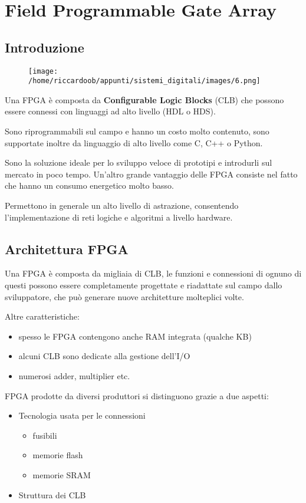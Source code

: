 \chapter{Field Programmable Gate Array}

\section{Introduzione}
\begin{figure}[H]
    \centering
    \texttt{[image: /home/riccardoob/appunti/sistemi\_digitali/images/6.png]}
\end{figure}

Una FPGA è composta da \textbf{Configurable Logic Blocks} (CLB) che possono essere connessi con linguaggi ad alto livello (HDL o HDS).

Sono riprogrammabili sul campo e hanno un costo molto contenuto, sono supportate inoltre da linguaggio di alto livello come C, C++ o Python.

Sono la soluzione ideale per lo sviluppo veloce di prototipi e introdurli sul mercato in poco tempo. Un'altro grande vantaggio delle FPGA consiste nel fatto che hanno un consumo energetico molto basso. 

Permettono in generale un alto livello di astrazione, consentendo l'implementazione di reti logiche e algoritmi a livello hardware.

\section{Architettura FPGA}
Una FPGA è composta da migliaia di CLB, le funzioni e connessioni di ognuno di questi possono essere completamente progettate e riadattate sul campo dallo sviluppatore, che può generare nuove architetture molteplici volte.

Altre caratteristiche:
\begin{itemize}
    \item spesso le FPGA contengono anche RAM integrata (qualche KB)
    \item alcuni CLB sono dedicate alla gestione dell'I/O
    \item numerosi adder, multiplier etc.
\end{itemize}

\newpage
FPGA prodotte da diversi produttori si distinguono grazie a due aspetti:
\begin{itemize}
    \item Tecnologia usata per le connessioni
    \begin{itemize}
        \item fusibili
        \item memorie flash
        \item memorie SRAM
    \end{itemize}
    \item Struttura dei CLB
\end{itemize}

